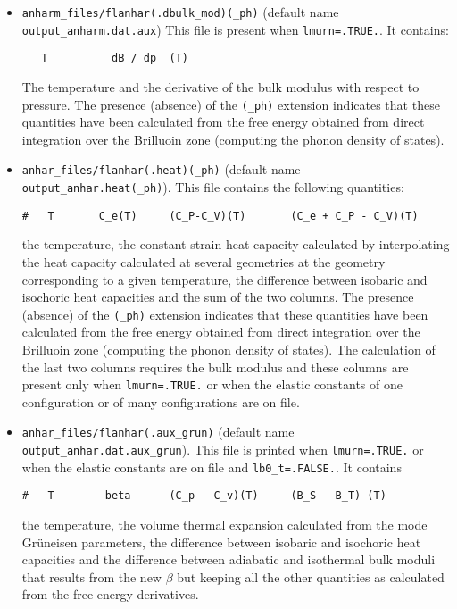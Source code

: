\documentclass[12pt,a4paper]{article}
\begin{document}
\begin{itemize}
\item \texttt{anharm\_files/flanhar(.dbulk\_mod)(\_ph)} 
(default name \texttt{output\_anharm.dat.aux})
This file is present when \texttt{lmurn=.TRUE.}. It contains:
\begin{verbatim}
   T          dB / dp  (T)  
\end{verbatim}
The temperature and the derivative of the bulk modulus with respect 
to pressure. 
The presence (absence) of the \texttt{(\_ph)} extension indicates that these 
quantities have been calculated from the free energy obtained from direct 
integration over the Brilluoin zone (computing the phonon density of states). 

\item 
\texttt{anhar\_files/flanhar(.heat)(\_ph)}
(default name \texttt{output\_anhar.heat(\_ph)}). 
This file contains the following quantities:
\begin{verbatim}
#   T       C_e(T)     (C_P-C_V)(T)       (C_e + C_P - C_V)(T)    
\end{verbatim}
the temperature, the constant strain heat capacity calculated 
by interpolating the heat capacity calculated at several geometries 
at the geometry corresponding to a given temperature, the
difference between isobaric and isochoric heat capacities and the
sum of the two columns. 
The presence (absence) of the \texttt{(\_ph)} extension indicates that
these quantities have been calculated from the free energy obtained from 
direct integration over the Brilluoin zone (computing the phonon density
of states). 
The calculation of the last two columns requires the bulk modulus
and these columns are present only when \texttt{lmurn=.TRUE.} or 
when the elastic constants of one configuration or of many configurations
are on file. 

\item 
\texttt{anhar\_files/flanhar(.aux\_grun)} 
(default name \texttt{output\_anhar.dat.aux\_grun}). This file is printed
when \texttt{lmurn=.TRUE.} or when the elastic
constants are on file and \texttt{lb0\_t=.FALSE.}. It contains
\begin{verbatim}
#   T        beta      (C_p - C_v)(T)     (B_S - B_T) (T)
\end{verbatim}
the temperature, the volume thermal expansion calculated from the mode 
Gr\"uneisen parameters, the difference
between isobaric and isochoric heat capacities and the difference between
adiabatic and isothermal bulk moduli that results
from the new $\beta$ but keeping all the other quantities as calculated
from the free energy derivatives. 


\end{itemize}
\end{document}
